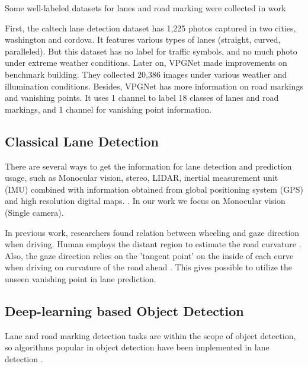 \begin{spacing}{1.5}
Some well-labeled datasets for lanes and road marking were collected in work \cite{caltech, lee2017vpgnet}

First, the caltech lane detection dataset \cite{caltech} has 1,225 photos captured in two cities, washington and cordova. It features various types of lanes (straight, curved, paralleled). But this dataset has no label for traffic symbols, and no much photo under extreme weather conditions. Later on, VPGNet \cite{lee2017vpgnet} made improvements on benchmark building. They collected 20,386 images under various weather and illumination conditions. Besides, VPGNet has more information on road markings and vanishing points. It uses 1 channel to label 18 classes of lanes and road markings, and 1 channel for vanishing point information.

\subsection{Classical Lane Detection}

There are several ways to get the information for lane detection and prediction usage, such as Monocular vision, stereo, LIDAR, inertial measurement unit (IMU) combined with information obtained from global positioning system (GPS) and high resolution digital maps. \cite{hillel2014recent}. In our work we focus on Monocular vision (Single camera).

In previous work, researchers found relation between wheeling and gaze direction when driving. Human employs the distant region to estimate the road curvature \cite{land1995parts}. Also, the gaze direction relies on the 'tangent point' on the inside of each curve when driving on curvature of the road ahead \cite{land1994we}. This gives possible to utilize the unseen vanishing point in lane prediction.

\subsection{Deep-learning based Object Detection}

Lane and road marking detection tasks are within the scope of object detection, so algorithms popular in object detection have been implemented in lane detection \cite{tang2020review}. 


\end{spacing}

